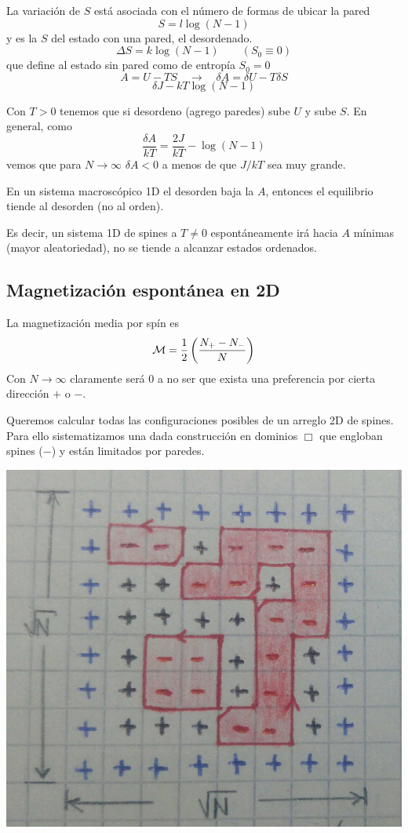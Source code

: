\documentclass[10pt,oneside]{CBFT_book}
\begin{document}
La variación de $S$ está asociada con el número de formas de ubicar la pared
\[
	S = l \log (N-1)
\]
y es la $S$ del estado con una pared, el desordenado.
\[
	\Delta S = k \log(N-1)	\qquad (S_0 \equiv 0)
\]
que define al estado sin pared como de entropía $S_0=0$
\[
	A = U - TS \quad \rightarrow \quad \delta A = \delta U - T \delta S
\]
\[
	\delta J - kT \log(N-1)
\]

Con $T > 0$ tenemos que si desordeno (agrego paredes) sube $U$ y sube $S$.
En general, como 
\[
	\frac{\delta A}{kT} = \frac{2J}{kT} - \log(N-1)
\]
vemos que para $N\to\infty$ $\delta A < 0$ a menos de que $J/kT$ sea muy grande.


En un sistema macroscópico 1D el desorden baja la $A$, entonces el equilibrio tiende
al desorden (no al orden).

Es decir, un sistema 1D de spines a $ T \neq 0 $ espontáneamente irá hacia $ A $
mínimas (mayor aleatoriedad), no se tiende a alcanzar estados ordenados.

\subsection{Magnetización espontánea en 2D}

La magnetización media por spín es
\[
	\mathcal{M} = \frac{1}{2} \left( \frac{ N_+ - N_- }{ N } \right)
\]
Con $N\to\infty$ claramente será 0 a no ser que exista una preferencia por cierta dirección $+$ o $-$.

Queremos calcular todas las configuraciones posibles de un arreglo 2D de spines.
Para ello sistematizamos una dada construcción en dominios $\Box$ que engloban spines ($-$) y están
limitados por paredes.

\includegraphics[scale=0.35]{images/1625625283.jpg}
\end{document}
